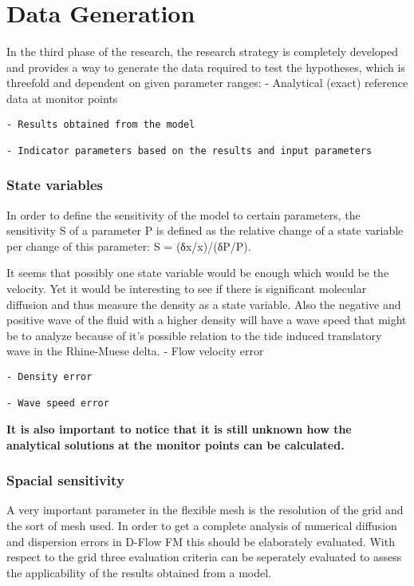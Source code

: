 \chapter{Data Generation}\label{data-generation}

In the third phase of the research, the research strategy is completely
developed and provides a way to generate the data required to test the
hypotheses, which is threefold and dependent on given parameter ranges:
- Analytical (exact) reference data at monitor points

\begin{verbatim}
- Results obtained from the model

- Indicator parameters based on the results and input parameters
\end{verbatim}

\subsection{State variables}\label{state-variables}

In order to define the sensitivity of the model to certain parameters,
the sensitivity S of a parameter P is defined as the relative change of
a state variable per change of this parameter: S = (δx/x)/(δP/P).

It seems that possibly one state variable would be enough which would be
the velocity. Yet it would be interesting to see if there is significant
molecular diffusion and thus measure the density as a state variable.
Also the negative and positive wave of the fluid with a higher density
will have a wave speed that might be to analyze because of it's possible
relation to the tide induced translatory wave in the Rhine-Muese delta.
- Flow velocity error

\begin{verbatim}
- Density error

- Wave speed error
\end{verbatim}

\textbf{It is also important to notice that it is still unknown how the
analytical solutions at the monitor points can be calculated.}

\subsection{Spacial sensitivity}\label{spacial-sensitivity}

A very important parameter in the flexible mesh is the resolution of the
grid and the sort of mesh used. In order to get a complete analysis of
numerical diffusion and dispersion errors in D-Flow FM this should be
elaborately evaluated. With respect to the grid three evaluation
criteria can be seperately evaluated to assess the applicability of the
results obtained from a model.

